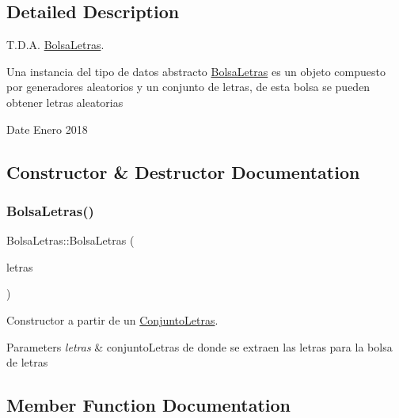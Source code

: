 \subsection{Detailed Description}
T.\+D.\+A. \mbox{\hyperlink{classBolsaLetras}{Bolsa\+Letras}}. 

Una instancia del tipo de datos abstracto {\ttfamily \mbox{\hyperlink{classBolsaLetras}{Bolsa\+Letras}}} es un objeto compuesto por generadores aleatorios y un conjunto de letras, de esta bolsa se pueden obtener letras aleatorias

\begin{DoxyDate}{Date}
Enero 2018 
\end{DoxyDate}


\subsection{Constructor \& Destructor Documentation}
\mbox{\label{classBolsaLetras_a714c83912cf268e7ee8305eb641bf976}} 
\subsubsection{\texorpdfstring{BolsaLetras()}{BolsaLetras()}}
{\footnotesize\ttfamily Bolsa\+Letras\+::\+Bolsa\+Letras (\begin{DoxyParamCaption}\item[{\mbox{\hyperlink{classConjuntoLetras}{Conjunto\+Letras}}}]{letras }\end{DoxyParamCaption})}



Constructor a partir de un \mbox{\hyperlink{classConjuntoLetras}{Conjunto\+Letras}}. 


\begin{DoxyParams}{Parameters}
{\em letras} & conjunto\+Letras de donde se extraen las letras para la bolsa de letras \\
\hline
\end{DoxyParams}


\subsection{Member Function Documentation}
\mbox{\label{classBolsaLetras_ae324c593294fa22e0b4e6f5cc6ecca99}} 
